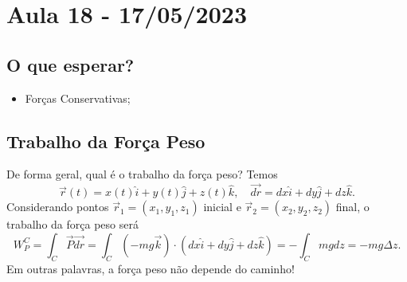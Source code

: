 \documentclass[physics_notes.tex]{subfiles}
\begin{document}
\section{Aula 18 - 17/05/2023}
\subsection{O que esperar?}
\begin{itemize}
	\item Forças Conservativas;
\end{itemize}
\subsection{Trabalho da Força Peso}
De forma geral, qual é o trabalho da força peso? Temos
\[
	\vec{r}(t) = x(t)\hat{i} + y(t)\hat{j} + z(t)\hat{k},\quad \vec{dr} = dx \hat{i} + dy \hat{j} + dz \hat{k}.
\]
Considerando pontos \(\vec{r}_{1} = (x_{1}, y_{1}, z_{1})\) inicial e \(\vec{r}_{2} = (x_{2}, y_{2}, z_{2})\) final, o trabalho da força peso será
\[
	W_{P}^{C} = \int_{C}^{} \vec{P} \vec{dr} = \int_{C}^{}(-mg \vec{k})\cdot (dx \hat{i} + dy \hat{j} + dz \hat{k}) = - \int_{C}^{}mgdz = -mg\Delta z.
\]
Em outras palavras, a força peso não depende do caminho!
\end{document}
